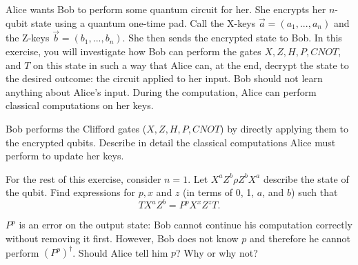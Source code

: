 \documentclass[a4paper,10pt,landscape,twocolumn]{scrartcl}
\newcommand{\ket}[1]{\lvert #1 \rangle}
\begin{document}
\begin{exercise}
	Alice wants Bob to perform some quantum circuit for her. She encrypts her $n$-qubit state using a quantum one-time pad. Call the X-keys $\vec{a} = (a_1, ..., a_n)$ and the Z-keys $\vec{b} = (b_1, ..., b_n)$. She then sends the encrypted state to Bob. In this exercise, you will investigate how Bob can perform the gates $X, Z, H, P, CNOT$, and $T$ on this state in such a way that Alice can, at the end, decrypt the state to the desired outcome: the circuit applied to her input. Bob should not learn anything about Alice's input. During the computation, Alice can perform classical computations on her keys.
	\begin{subex}
		Bob performs the Clifford gates ($X, Z, H, P, CNOT$) by directly applying them to the encrypted qubits. Describe in detail the classical computations Alice must perform to update her keys.
	\end{subex}
	\begin{subex}
		For the rest of this exercise, consider $n = 1$. Let $X^{a}Z^{b}\rho Z^{b}X^{a}$ describe the state of the qubit. Find expressions for $p, x$ and $z$ (in terms of 0, 1, $a$, and $b$) such that
		\[
		TX^{a}Z^{b} = P^pX^xZ^zT.
		\]
	\end{subex}
	\begin{subex}
		$P^p$ is an error on the output state: Bob cannot continue his computation correctly without removing it first. However, Bob does not know $p$ and therefore he cannot perform $(P^p)^{\dagger}$. Should Alice tell him $p$? Why or why not?
	\end{subex}
\end{exercise}
\end{document}
